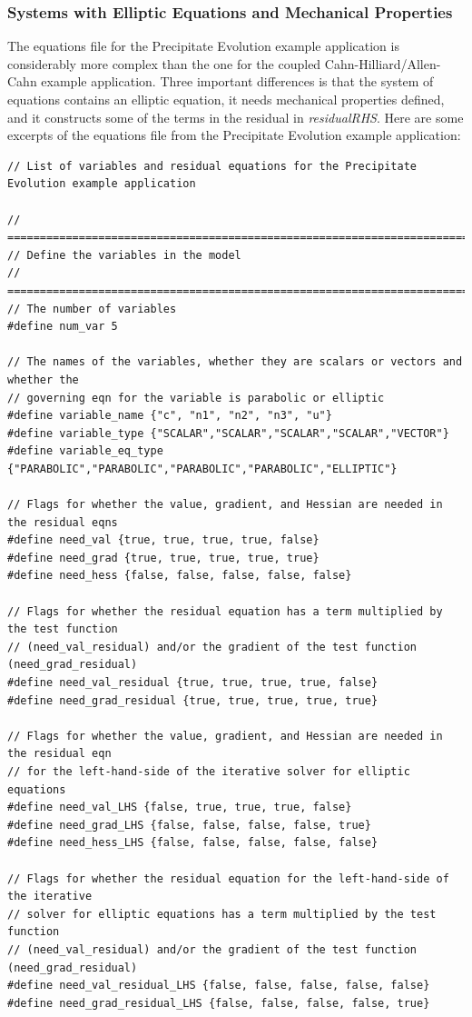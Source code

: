 \documentclass[10pt]{article} %
\begin{document}
\subsubsection{Systems with Elliptic Equations and Mechanical Properties}
The equations file for the Precipitate Evolution example application is considerably more complex than the one for the  coupled Cahn-Hilliard/Allen-Cahn example application. Three important differences is that the system of equations contains an elliptic equation, it needs mechanical properties defined, and it constructs some of the terms in the residual in \emph{residualRHS}. Here are some excerpts of the equations file from the Precipitate Evolution example application:
\tiny
\begin{lstlisting}
// List of variables and residual equations for the Precipitate Evolution example application

// =================================================================================
// Define the variables in the model
// =================================================================================
// The number of variables
#define num_var 5

// The names of the variables, whether they are scalars or vectors and whether the
// governing eqn for the variable is parabolic or elliptic
#define variable_name {"c", "n1", "n2", "n3", "u"}
#define variable_type {"SCALAR","SCALAR","SCALAR","SCALAR","VECTOR"}
#define variable_eq_type {"PARABOLIC","PARABOLIC","PARABOLIC","PARABOLIC","ELLIPTIC"}

// Flags for whether the value, gradient, and Hessian are needed in the residual eqns
#define need_val {true, true, true, true, false}
#define need_grad {true, true, true, true, true}
#define need_hess {false, false, false, false, false}

// Flags for whether the residual equation has a term multiplied by the test function
// (need_val_residual) and/or the gradient of the test function (need_grad_residual)
#define need_val_residual {true, true, true, true, false}
#define need_grad_residual {true, true, true, true, true}

// Flags for whether the value, gradient, and Hessian are needed in the residual eqn
// for the left-hand-side of the iterative solver for elliptic equations
#define need_val_LHS {false, true, true, true, false}
#define need_grad_LHS {false, false, false, false, true}
#define need_hess_LHS {false, false, false, false, false}

// Flags for whether the residual equation for the left-hand-side of the iterative
// solver for elliptic equations has a term multiplied by the test function
// (need_val_residual) and/or the gradient of the test function (need_grad_residual)
#define need_val_residual_LHS {false, false, false, false, false}
#define need_grad_residual_LHS {false, false, false, false, true}


\end{lstlisting}
\end{document}
